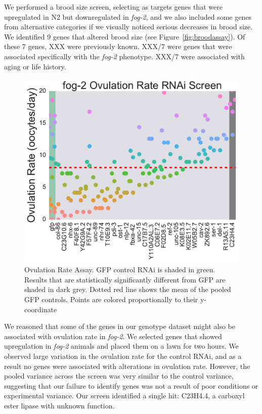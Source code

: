 \documentclass[9pt,twocolumn,twoside]{gsag3jnl}
\newcommand{\fog}{\emph{fog-2}}
\begin{document}
We performed a brood size screen, selecting as targets genes that were upregulated in N2 but downregulated in \fog{}, and we also included some genes from alternative categories if we visually noticed serious decreases in brood size. We identified 9 genes that altered brood size (see Figure~\ref{fig:broodassay}). Of these 7 genes, XXX were previously known. XXX/7 were genes that were associated specifically with the \fog{} phenotype. XXX/7 were associated with aging or life history.


\begin{figure}[htbp]
\renewcommand{\familydefault}{\sfdefault}\normalfont{}
\centering
\includegraphics[width=\linewidth]{../output/figs/final_figs/oocyte_rate_assay.pdf}
\caption{Ovulation Rate Assay. GFP control RNAi is shaded in green. Results that are statistically significantly different from GFP are shaded in dark grey. Dotted red line shows the mean of the pooled GFP controls. Points are colored proportionally to their y-coordinate
}%
\label{fig:oocytedropping}
\end{figure}

We reasoned that some of the genes in our genotype dataset might also be associated with ovulation rate in \fog{}. We selected genes that showed upregulation in \fog{} animals and placed them on a lawn for two hours. We observed large variation in the ovulation rate for the control RNAi, and as a result no genes were associated with alterations in ovulation rate. However, the pooled variance across the screen was very similar to the control variance, suggesting that our failure to identify genes was not a result of poor conditions or experimental variance. Our screen identified a single hit: C23H4.4, a carboxyl ester lipase with unknown function.
\end{document}

